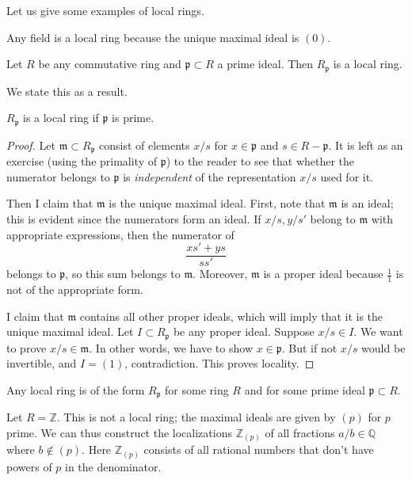 Let us give some examples of local rings.

\begin{example} 
Any field is a local ring because the unique maximal ideal is $(0)$.
\end{example} 

\begin{example} 
Let $R$ be any commutative ring and $\mathfrak{p}\subset R$ a prime ideal. Then
$R_{\mathfrak{p}}$ is a local ring.  

We state this as a result.
\begin{proposition} 
$R_{\mathfrak{p}}$ is a local ring if $\mathfrak{p}$ is prime.\end{proposition} 
\begin{proof} 
Let $\mathfrak{m} \subset R_{\mathfrak{p}}$ consist of elements $x/s$ for $x
\in \mathfrak{p}$ and $s \in R - \mathfrak{p}$. It is left as an exercise
(using the primality of $\mathfrak{p}$) to
the reader to see that whether the numerator belongs to $\mathfrak{p}$ is
\emph{independent} of the representation $x/s$ used for it.

Then I claim that $\mathfrak{m}$ is the
unique maximal ideal. First, note that $\mathfrak{m}$ is
an ideal; this is evident since the numerators form an ideal. If $x/s, y/s'$
belong to $\mathfrak{m}$ with appropriate expressions, then
the numerator of
\[ \frac{xs'+ys}{ss'}  \]
belongs to $\mathfrak{p}$, so this sum belongs to $\mathfrak{m}$.  Moreover,
$\mathfrak{m}$ is a proper ideal because $\frac{1}{1}$ is not of the
appropriate form.

I claim that $\mathfrak{m}$ contains all other proper ideals, which will imply
that it is the unique maximal ideal. Let $I \subset R_{\mathfrak{p}}$ be any
proper ideal. Suppose $x/s \in I$.  We want to prove $x/s \in \mathfrak{m}$.
In other words, we have to show $x \in \mathfrak{p}$. But if not $x/s$ would be
invertible, and $I = (1)$, contradiction. This proves locality.  
\end{proof} 
\end{example} 

\begin{exercise} 
Any local ring is of the form $R_{\mathfrak{p}}$ for some ring $R$ and for
some prime ideal $\mathfrak{p} \subset R$.
\end{exercise} 

\begin{example} 
Let $R = \mathbb{Z}$. This is not a local ring; the maximal ideals are given by
$(p)$ for $p$ prime.  We can thus construct the localizations
$\mathbb{Z}_{(p)}$ of all fractions $a/b \in \mathbb{Q}$ where $b \notin (p)$.
Here $\mathbb{Z}_{(p)}$ consists of all rational numbers that don't have powers of $p$ in the denominator.  
\end{example} 

